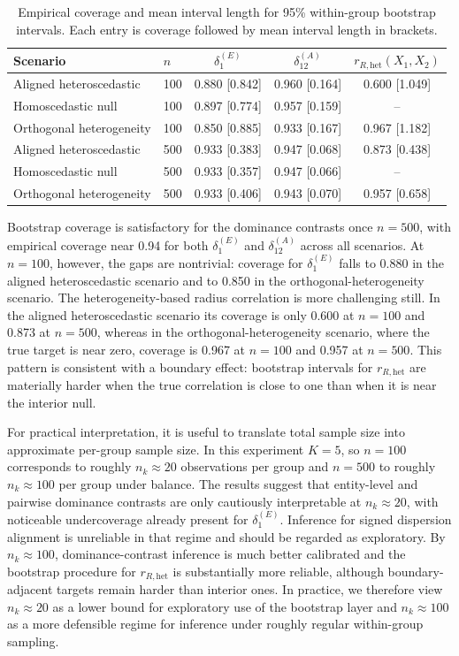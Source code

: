 \documentclass[preprint, times, 12pt, authoryear]{elsarticle}
\begin{document}
\begin{table}[ht]
	\centering
	\caption{Empirical coverage and mean interval length for 95\% within-group bootstrap intervals. Each entry is coverage followed by mean interval length in brackets.}
	\label{tab:sim_inference_coverage}
	\begin{tabular}{llccc}
		\toprule
		Scenario & $n$ & $\delta_1^{(E)}$ & $\delta_{12}^{(A)}$ & $r_{R,\mathrm{het}}(X_1,X_2)$ \\
		\midrule
		Aligned heteroscedastic & 100 & 0.880 [0.842] & 0.960 [0.164] & 0.600 [1.049] \\
		Homoscedastic null      & 100 & 0.897 [0.774] & 0.957 [0.159] & -- \\
		Orthogonal heterogeneity& 100 & 0.850 [0.885] & 0.933 [0.167] & 0.967 [1.182] \\
		\midrule
		Aligned heteroscedastic & 500 & 0.933 [0.383] & 0.947 [0.068] & 0.873 [0.438] \\
		Homoscedastic null      & 500 & 0.933 [0.357] & 0.947 [0.066] & -- \\
		Orthogonal heterogeneity& 500 & 0.933 [0.406] & 0.943 [0.070] & 0.957 [0.658] \\
		\bottomrule
	\end{tabular}
\end{table}

Bootstrap coverage is satisfactory for the dominance contrasts once $n=500$, with empirical coverage near 0.94 for both $\delta_1^{(E)}$ and $\delta_{12}^{(A)}$ across all scenarios. At $n=100$, however, the gaps are nontrivial: coverage for $\delta_1^{(E)}$ falls to 0.880 in the aligned heteroscedastic scenario and to 0.850 in the orthogonal-heterogeneity scenario. The heterogeneity-based radius correlation is more challenging still. In the aligned heteroscedastic scenario its coverage is only 0.600 at $n=100$ and 0.873 at $n=500$, whereas in the orthogonal-heterogeneity scenario, where the true target is near zero, coverage is 0.967 at $n=100$ and 0.957 at $n=500$. This pattern is consistent with a boundary effect: bootstrap intervals for $r_{R,\mathrm{het}}$ are materially harder when the true correlation is close to one than when it is near the interior null.

For practical interpretation, it is useful to translate total sample size into approximate per-group sample size. In this experiment $K=5$, so $n=100$ corresponds to roughly $n_k\approx 20$ observations per group and $n=500$ to roughly $n_k\approx 100$ per group under balance. The results suggest that entity-level and pairwise dominance contrasts are only cautiously interpretable at $n_k\approx 20$, with noticeable undercoverage already present for $\delta_1^{(E)}$. Inference for signed dispersion alignment is unreliable in that regime and should be regarded as exploratory. By $n_k\approx 100$, dominance-contrast inference is much better calibrated and the bootstrap procedure for $r_{R,\mathrm{het}}$ is substantially more reliable, although boundary-adjacent targets remain harder than interior ones. In practice, we therefore view $n_k\approx 20$ as a lower bound for exploratory use of the bootstrap layer and $n_k\approx 100$ as a more defensible regime for inference under roughly regular within-group sampling.
\end{document}
